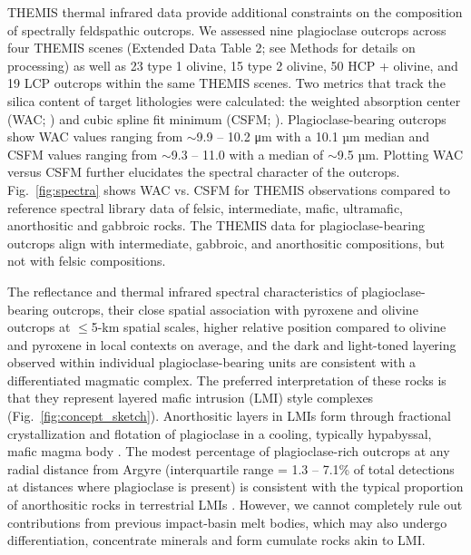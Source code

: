 \documentclass[12pt]{article}
\begin{document}
THEMIS thermal infrared data provide additional constraints on the composition of spectrally feldspathic outcrops. We assessed nine plagioclase outcrops across four THEMIS scenes (Extended Data Table 2; see Methods for details on processing) as well as 23 type 1 olivine, 15 type 2 olivine, 50 HCP + olivine, and 19 LCP outcrops within the same THEMIS scenes. Two metrics that track the silica content of target lithologies were calculated: the weighted absorption center (WAC; \citealt{Smith2013, Amador2016}) and cubic spline fit minimum (CSFM; \citealt{Rogers2015}). Plagioclase-bearing outcrops show WAC values ranging from $\sim$9.9 -- 10.2 μm with a 10.1 µm median and CSFM values ranging from $\sim$9.3 -- 11.0 with a median of $\sim$9.5 µm. Plotting WAC versus CSFM further elucidates the spectral character of the outcrops. Fig.~\ref{fig:spectra} shows WAC vs. CSFM for THEMIS observations compared to reference spectral library data of felsic, intermediate, mafic, ultramafic, anorthositic and gabbroic rocks. The THEMIS data for plagioclase-bearing outcrops align with intermediate, gabbroic, and anorthositic compositions, but not with felsic compositions.

The reflectance and thermal infrared spectral characteristics of plagioclase-bearing outcrops, their close spatial association with pyroxene and olivine outcrops at $\leq$5-km spatial scales, higher relative position compared to olivine and pyroxene in local contexts on average, and the dark and light-toned layering observed within individual plagioclase-bearing units are consistent with a differentiated magmatic complex. The preferred interpretation of these rocks is that they represent layered mafic intrusion (LMI) style complexes (Fig.~\ref{fig:concept_sketch}). Anorthositic layers in LMIs form through fractional crystallization and flotation of plagioclase in a cooling, typically hypabyssal, mafic magma body \citep{Ashwal1993}. The modest percentage of plagioclase-rich outcrops at any radial distance from Argyre (interquartile range = 1.3 -- 7.1\% of total detections at distances where plagioclase is present) is consistent with the typical proportion of anorthositic rocks in terrestrial LMIs \citep{Ashwal1993, Ashwal2021}. However, we cannot completely rule out contributions from previous impact-basin melt bodies, which may also undergo differentiation, concentrate minerals and form cumulate rocks akin to LMI.
\end{document}
